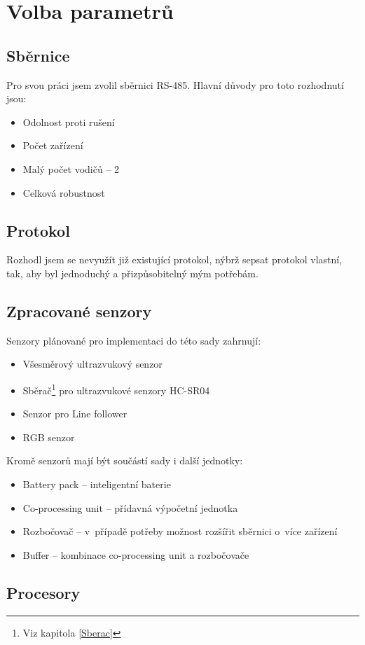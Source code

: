 \chapter{Volba parametrů}
\section{Sběrnice}
Pro svou práci jsem zvolil sběrnici RS-485.
Hlavní důvody pro toto rozhodnutí jsou:
\begin{itemize}
    \item Odolnost proti rušení
    \item Počet zařízení
    \item Malý počet vodičů -- 2
    \item Celková robustnost
\end{itemize}

\section{Protokol}
Rozhodl jsem se nevyužít již existující protokol, nýbrž sepsat protokol vlastní, tak, aby byl jednoduchý a přizpůsobitelný mým potřebám. 
\section{Zpracované senzory}
Senzory plánované pro implementaci do této sady zahrnují:
\begin{itemize}
    \item Všesměrový ultrazvukový senzor
    \item Sběrač\footnote{Viz kapitola \ref{Sberac}} pro ultrazvukové senzory HC-SR04 
    \item Senzor pro Line follower
    \item RGB senzor
    
\end{itemize}
Kromě senzorů mají být součástí sady i další jednotky:
\begin{itemize}
    \item Battery pack -- inteligentní baterie
    \item Co-processing unit -- přídavná výpočetní jednotka
    \item Rozbočovač -- v~případě potřeby možnost rozšířit sběrnici o~více zařízení
    \item Buffer -- kombinace co-processing unit a rozbočovače
\end{itemize}
\section{Procesory}

